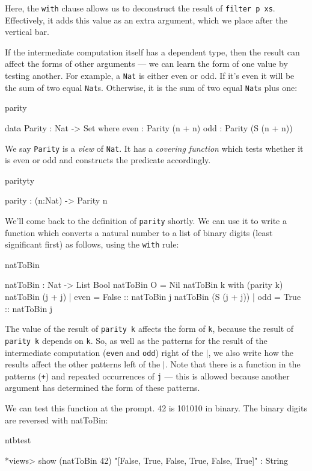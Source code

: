 \noindent
Here, the \texttt{with} clause allows us to deconstruct the result of 
\texttt{filter p xs}.
Effectively, it adds this value as an extra argument, which we place after the
vertical bar.

If the intermediate computation itself has a dependent type, then the result
can affect the forms of other arguments --- we can learn the form of one value by
testing another. For example, a \texttt{Nat} is either even or odd. If it's even it will
be the sum of two equal \texttt{Nat}s. Otherwise, it is the sum of two equal \texttt{Nat}s 
plus one:

\begin{SaveVerbatim}{parity}

data Parity : Nat -> Set where
   even : Parity (n + n)
   odd  : Parity (S (n + n))

\end{SaveVerbatim}

\noindent
We say \texttt{Parity} is a \emph{view} of \texttt{Nat}. 
It has a \emph{covering function} which tests whether
it is even or odd and constructs the predicate accordingly.

\begin{SaveVerbatim}{parityty}

parity : (n:Nat) -> Parity n

\end{SaveVerbatim}

\noindent
We'll come back to the definition of \texttt{parity} shortly. We can use it
to write a function which converts a natural number to a list of binary digits
(least significant first) as follows, using the \texttt{with} rule:

\begin{SaveVerbatim}{natToBin}

natToBin : Nat -> List Bool
natToBin O = Nil
natToBin k with (parity k)
   natToBin (j + j)     | even = False :: natToBin j
   natToBin (S (j + j)) | odd  = True  :: natToBin j

\end{SaveVerbatim}

\noindent
The value of the result of \texttt{parity k} affects the form of \texttt{k}, 
because the result
of \texttt{parity k} depends on \texttt{k}. 
So, as well as the patterns for the result of the
intermediate computation (\texttt{even} and \texttt{odd}) right of the 
\texttt{$\mid$}, we also write how
the results affect the other patterns left of the $\mid$. Note that there is a
function in the patterns (\texttt{+}) and repeated occurrences of \texttt{j} --- 
this is allowed
because another argument has determined the form of these patterns.

We can test this function at the prompt. 42 is 101010 in binary. The binary digits
are reversed with natToBin:

\begin{SaveVerbatim}{ntbtest}

*views> show (natToBin 42)
"[False, True, False, True, False, True]" : String

\end{SaveVerbatim}


